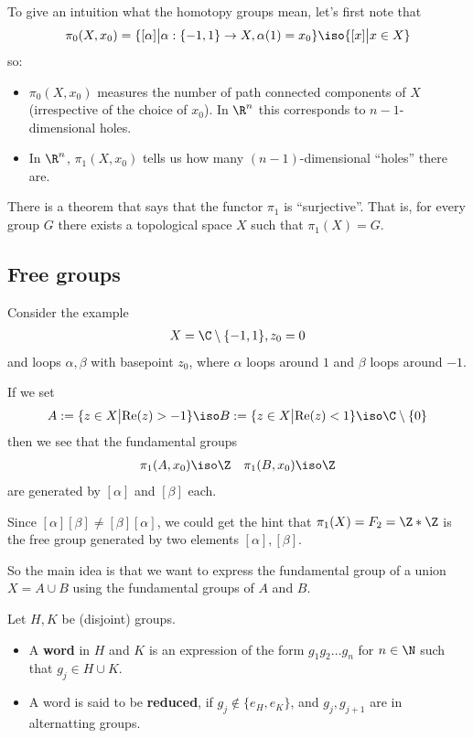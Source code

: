 To give an intuition what the homotopy groups mean, let's first note that
\begin{align*}
  \pi_0(X,x_0) = \{[\alpha] \big\vert \alpha: \{-1,1\} \to  X, \alpha(1) = x_0\} \iso \{[x] \big\vert x \in X\}
\end{align*}
so:
\begin{itemize}
  \item $\pi_0(X,x_0)$ measures the number of path connected components of $X$ (irrespective of the choice of $x_0$). In $\R^{n}$ this corresponds to $n-1$-dimensional holes.
  \item In $\R^{n}$, $\pi_1(X,x_0)$ tells us how many $(n-1)$-dimensional ``holes'' there are.
\end{itemize}

\begin{rem}[]
  There is a theorem that says that the functor $\pi_1$ is ``surjective''. 
  That is, for every group $G$ there exists a topological space $X$ such that $\pi_1(X) = G$.
\end{rem}

\subsection{Free groups}
Consider the example
\begin{align*}
  X = \C \setminus \{-1,1\}, z_0 = 0
\end{align*}
and loops $\alpha,\beta$ with basepoint $z_0$, where $\alpha$ loops around $1$ and $\beta$ loops around $-1$.

If we set
\begin{align*}
  A := \{z \in X \big\vert \text{Re}(z) > -1\} \iso B:= \{z \in X \big\vert \text{Re}(z) < 1\} \iso \C \setminus \{0\}
\end{align*}
then we see that the fundamental groups 
\begin{align*}
  \pi_1(A,x_0) \iso \Z \quad \pi_1(B,x_0) \iso \Z
\end{align*}
are generated by $[\alpha]$ and $[\beta]$ each.

Since $[\alpha] [\beta] \neq [\beta] [\alpha]$, we could get the hint that $\pi_1(X) = F_2 = \Z \ast \Z$ is the free group generated by two elements $[\alpha],[\beta]$.

So the main idea is that we want to express the fundamental group of a union $X = A \cup B$ using the fundamental groups of $A$ and $B$.

\begin{dfn}[]
  Let $H,K$ be (disjoint) groups. 
  \begin{itemize}
    \item A \textbf{word} in $H$ and $K$ is an expression of the form $g_1g_2 \dots g_n$ for $n \in \N$ such that $g_j \in H \cup K$.
    \item A word is said to be \textbf{reduced}, if $g_j \notin \{e_H,e_K\}$, and $g_j,g_{j+1}$ are in alternatting groups.
  \end{itemize}
\end{dfn}

